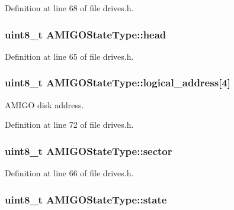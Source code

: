 Definition at line 68 of file drives.\+h.

\subsubsection[{\texorpdfstring{head}{head}}]{\setlength{\rightskip}{0pt plus 5cm}uint8\+\_\+t A\+M\+I\+G\+O\+State\+Type\+::head}\hypertarget{structAMIGOStateType_a92b01a4e3912d2fcacebcc15a21c66c9}{}\label{structAMIGOStateType_a92b01a4e3912d2fcacebcc15a21c66c9}


Definition at line 65 of file drives.\+h.

\subsubsection[{\texorpdfstring{logical\+\_\+address}{logical_address}}]{\setlength{\rightskip}{0pt plus 5cm}uint8\+\_\+t A\+M\+I\+G\+O\+State\+Type\+::logical\+\_\+address\mbox{[}4\mbox{]}}\hypertarget{structAMIGOStateType_a924a685ad68765a91714aa6ad4b20d9f}{}\label{structAMIGOStateType_a924a685ad68765a91714aa6ad4b20d9f}


A\+M\+I\+GO disk address. 



Definition at line 72 of file drives.\+h.

\subsubsection[{\texorpdfstring{sector}{sector}}]{\setlength{\rightskip}{0pt plus 5cm}uint8\+\_\+t A\+M\+I\+G\+O\+State\+Type\+::sector}\hypertarget{structAMIGOStateType_a90615dad99e4fb6852b176bf6712f40b}{}\label{structAMIGOStateType_a90615dad99e4fb6852b176bf6712f40b}


Definition at line 66 of file drives.\+h.

\subsubsection[{\texorpdfstring{state}{state}}]{\setlength{\rightskip}{0pt plus 5cm}uint8\+\_\+t A\+M\+I\+G\+O\+State\+Type\+::state}\hypertarget{structAMIGOStateType_ab3ba7202566a784c93d437960f8f332e}{}\label{structAMIGOStateType_ab3ba7202566a784c93d437960f8f332e}


